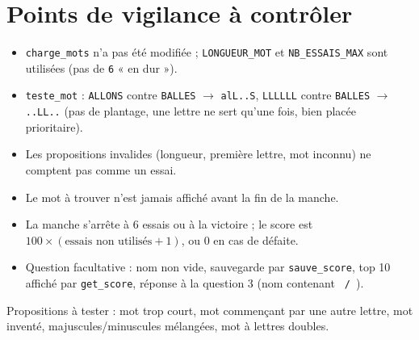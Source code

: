 \documentclass[10pt,a4paper]{article}
\begin{document}
\section*{Points de vigilance à contrôler}
\begin{itemize}
\item \texttt{charge\_mots} n'a pas été modifiée ; \texttt{LONGUEUR\_MOT} et \texttt{NB\_ESSAIS\_MAX} sont utilisées (pas de \texttt{6} « en dur »).
\item \texttt{teste\_mot} : \texttt{ALLONS} contre \texttt{BALLES} $\to$ \texttt{alL..S}, \texttt{LLLLLL} contre \texttt{BALLES} $\to$ \texttt{..LL..} (pas de plantage, une lettre ne sert qu'une fois, bien placée prioritaire).
\item Les propositions invalides (longueur, première lettre, mot inconnu) ne comptent pas comme un essai.
\item Le mot à trouver n'est jamais affiché avant la fin de la manche.
\item La manche s'arrête à 6 essais ou à la victoire ; le score est $100\times(\text{essais non utilisés}+1)$, ou 0 en cas de défaite.
\item Question facultative : nom non vide, sauvegarde par \texttt{sauve\_score}, top 10 affiché par \texttt{get\_score}, réponse à la question 3 (nom contenant \texttt{ / }).
\end{itemize}
\smallskip
Propositions à tester : mot trop court, mot commençant par une autre lettre, mot inventé, majuscules/minuscules mélangées, mot à lettres doubles.
\end{document}
